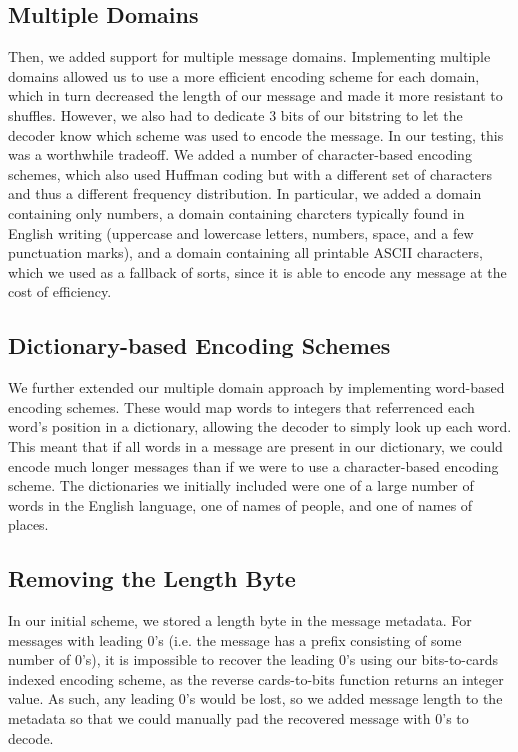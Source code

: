 \documentclass[titlepage]{article}
\begin{document}
\subsection{Multiple Domains}
Then, we added support for multiple message domains. Implementing multiple domains allowed us to use a more efficient encoding scheme for each domain, which in turn decreased the length of our message and made it more resistant to shuffles. However, we also had to dedicate 3 bits of our bitstring to let the decoder know which scheme was used to encode the message. In our testing, this was a worthwhile tradeoff. We added a number of character-based encoding schemes, which also used Huffman coding but with a different set of characters and thus a different frequency distribution. In particular, we added a domain containing only numbers, a domain containing charcters typically found in English writing (uppercase and lowercase letters, numbers, space, and a few punctuation marks), and a domain containing all printable ASCII characters, which we used as a fallback of sorts, since it is able to encode any message at the cost of efficiency.

\subsection{Dictionary-based Encoding Schemes}
We further extended our multiple domain approach by implementing word-based encoding schemes. These would map words to integers that referrenced each word's position in a dictionary, allowing the decoder to simply look up each word. This meant that if all words in a message are present in our dictionary, we could encode much longer messages than if we were to use a character-based encoding scheme. The dictionaries we initially included were one of a large number of words in the English language, one of names of people, and one of names of places.

\subsection{Removing the Length Byte} \label{no_length_byte}
In our initial scheme, we stored a length byte in the message metadata. For messages with leading 0's (i.e. the message has a prefix consisting of some number of 0's), it is impossible to recover the leading 0's using our bits-to-cards indexed encoding scheme, as the reverse cards-to-bits function returns an integer value. As such, any leading 0's would be lost, so we added message length to the metadata so that we could manually pad the recovered message with 0's to decode.
\end{document}
